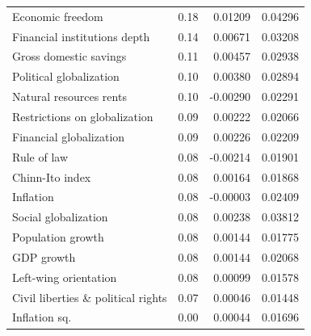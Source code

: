 \begin{refsection}
\begin{subappendices}
\begin{table}[ht!]
\begin{tabular}{lrrr}
    Economic freedom & 0.18 & 0.01209 & 0.04296 \\ 
    Financial institutions depth & 0.14 & 0.00671 & 0.03208 \\ 
    Gross domestic savings & 0.11 & 0.00457 & 0.02938 \\ 
    Political globalization & 0.10 & 0.00380 & 0.02894 \\
    Natural resources rents & 0.10 & -0.00290 & 0.02291 \\ 
    Restrictions on globalization & 0.09 & 0.00222 & 0.02066 \\ 
    Financial globalization & 0.09 & 0.00226 & 0.02209 \\
    Rule of law & 0.08 & -0.00214 & 0.01901 \\ 
    Chinn-Ito index & 0.08 & 0.00164 & 0.01868 \\
    Inflation & 0.08 & -0.00003 & 0.02409 \\ 
    Social globalization & 0.08 & 0.00238 & 0.03812 \\
    Population growth & 0.08 & 0.00144 & 0.01775 \\
    GDP growth & 0.08 & 0.00144 & 0.02068 \\
    Left-wing orientation & 0.08 & 0.00099 & 0.01578 \\ 
    Civil liberties \& political rights & 0.07 & 0.00046 & 0.01448 \\
    Inflation sq. & 0.00 & 0.00044 & 0.01696 \\ 
    \bottomrule
  \end{tabular}
  \end{table}
  

\end{subappendices}
\end{refsection}
